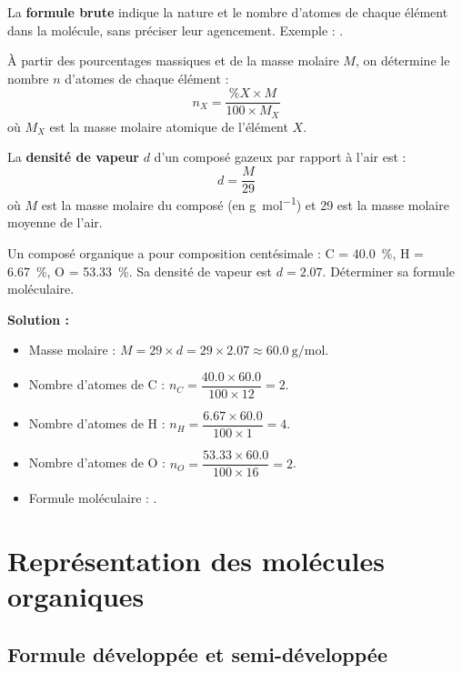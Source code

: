 \begin{definition}
La \textbf{formule brute} indique la nature et le nombre d'atomes de chaque élément dans la molécule, sans préciser leur agencement. Exemple : .
\end{definition}

\begin{propriete}
À partir des pourcentages massiques et de la masse molaire $M$, on détermine le nombre $n$ d'atomes de chaque élément :
\[
n_X = \dfrac{\%X \times M}{100 \times M_X}
\]
où $M_X$ est la masse molaire atomique de l'élément $X$.
\end{propriete}

\begin{definition}
La \textbf{densité de vapeur} $d$ d'un composé gazeux par rapport à l'air est :
\[
d = \frac{M}{29}
\]
où $M$ est la masse molaire du composé (en \si{\gram\per\mol}) et \num{29} est la masse molaire moyenne de l'air.
\end{definition}

\begin{exemple}
Un composé organique a pour composition centésimale : C = \SI{40.0}{\%}, H = \SI{6.67}{\%}, O = \SI{53.33}{\%}. Sa densité de vapeur est $d = \num{2.07}$. Déterminer sa formule moléculaire.

\noindent \textbf{Solution :}
\begin{itemize}
    \item Masse molaire : $M = 29 \times d = 29 \times \num{2.07} \approx \SI{60.0}{\gram\per\mol}$.
    \item Nombre d'atomes de C : $n_C = \dfrac{40.0 \times 60.0}{100 \times 12} = 2$.
    \item Nombre d'atomes de H : $n_H = \dfrac{6.67 \times 60.0}{100 \times 1} = 4$.
    \item Nombre d'atomes de O : $n_O = \dfrac{53.33 \times 60.0}{100 \times 16} = 2$.
    \item Formule moléculaire : .
\end{itemize}
\end{exemple}

\section{Représentation des molécules organiques}

\subsection{Formule développée et semi-développée}

